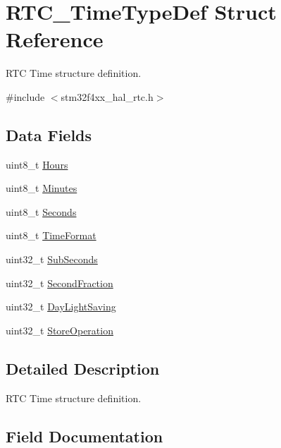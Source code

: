 \hypertarget{struct_r_t_c___time_type_def}{}\section{R\+T\+C\+\_\+\+Time\+Type\+Def Struct Reference}
\label{struct_r_t_c___time_type_def}


R\+TC Time structure definition.  




{\ttfamily \#include $<$stm32f4xx\+\_\+hal\+\_\+rtc.\+h$>$}

\subsection*{Data Fields}
\begin{DoxyCompactItemize}
\item 
uint8\+\_\+t \hyperlink{struct_r_t_c___time_type_def_afb56ed968b4967d127517ebb4ed40d8b}{Hours}
\item 
uint8\+\_\+t \hyperlink{struct_r_t_c___time_type_def_a362931e6bba28836c36423197e429f29}{Minutes}
\item 
uint8\+\_\+t \hyperlink{struct_r_t_c___time_type_def_a297ae76c2b7de4f939d996d93240c6b2}{Seconds}
\item 
uint8\+\_\+t \hyperlink{struct_r_t_c___time_type_def_a701c21c52472e8caf9e23653ec2fd604}{Time\+Format}
\item 
uint32\+\_\+t \hyperlink{struct_r_t_c___time_type_def_ae24e60a3b9549fd02b00ad6762ae5b77}{Sub\+Seconds}
\item 
uint32\+\_\+t \hyperlink{struct_r_t_c___time_type_def_ab9e6aabb125b82b1e25cd1070a2d2ecb}{Second\+Fraction}
\item 
uint32\+\_\+t \hyperlink{struct_r_t_c___time_type_def_ac873d19a4d99d3f447f96ecae2bf3c5d}{Day\+Light\+Saving}
\item 
uint32\+\_\+t \hyperlink{struct_r_t_c___time_type_def_a7628b757d7c7a4ab30b6bbc45a028b7d}{Store\+Operation}
\end{DoxyCompactItemize}


\subsection{Detailed Description}
R\+TC Time structure definition. 

\subsection{Field Documentation}
\mbox{\label{struct_r_t_c___time_type_def_ac873d19a4d99d3f447f96ecae2bf3c5d}} 
